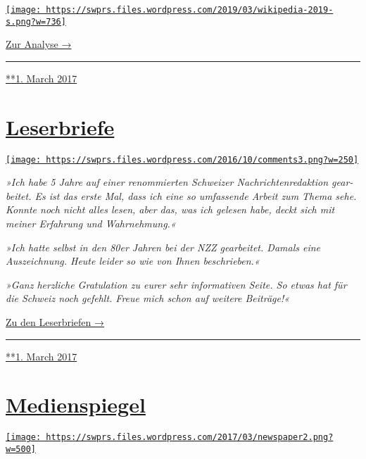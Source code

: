 \href{https://swprs.org/propaganda-in-der-wikipedia/}{\texttt{[image: https://swprs.files.wordpress.com/2019/03/wikipedia-2019-s.png?w=736]}}

\href{https://swprs.org/propaganda-in-der-wikipedia/}{Zur Analyse →}

\begin{center}\rule{0.5\linewidth}{\linethickness}\end{center}

\href{https://swprs.org/2017/03/01/propaganda-in-der-wikipedia/}{**1.
March 2017}

\hypertarget{leserbriefe}{%
\section{\texorpdfstring{\href{https://swprs.org/2017/03/01/leserbriefe/}{Leserbriefe}}{Leserbriefe}}\label{leserbriefe}}

\href{https://swprs.org/2017/03/01/leserbriefe/}{\texttt{[image: https://swprs.files.wordpress.com/2016/10/comments3.png?w=250]}}

\emph{»Ich habe 5 Jahre auf einer renom­mier­ten Schweizer
Nachrichten­redaktion ge­ar­bei­tet. Es ist das erste Mal, dass ich eine
so umfassende Arbeit zum Thema sehe. Konnte noch nicht alles lesen, aber
das, was ich gelesen habe, deckt sich mit meiner Erfahrung und
Wahr­nehmung.«}

\emph{»Ich hatte selbst in den 80er Jahren bei der NZZ gearbeitet.
Damals eine Auszeichnung. Heute leider so wie von Ihnen beschrieben.«}

\emph{»Ganz herzliche Gratulation zu eurer sehr infor­ma­tiven Seite. So
etwas hat für die Schweiz noch gefehlt. Freue mich schon auf weitere
Beiträge!«}

\href{https://swprs.org/leserbriefe/}{Zu den Leserbriefen →}

\begin{center}\rule{0.5\linewidth}{\linethickness}\end{center}

\href{https://swprs.org/2017/03/01/leserbriefe/}{**1. March 2017}

\hypertarget{medienspiegel}{%
\section{\texorpdfstring{\href{https://swprs.org/2017/03/01/medienspiegel/}{Medienspiegel}}{Medienspiegel}}\label{medienspiegel}}

\href{https://swprs.org/2017/03/01/medienspiegel/}{\texttt{[image: https://swprs.files.wordpress.com/2017/03/newspaper2.png?w=500]}}

